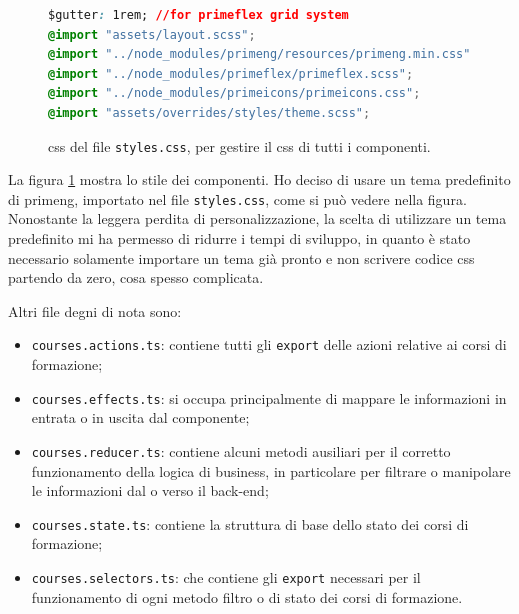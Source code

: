 \begin{figure}[H]
\centering
\begin{lstlisting}[language=CSS]
$gutter: 1rem; //for primeflex grid system
@import "assets/layout.scss";
@import "../node_modules/primeng/resources/primeng.min.css";
@import "../node_modules/primeflex/primeflex.scss";
@import "../node_modules/primeicons/primeicons.css";
@import "assets/overrides/styles/theme.scss";  
\end{lstlisting}
\caption{\label{fig:styles}\acrshort{css} del file \texttt{styles.css}, per gestire il \acrshort{css} di tutti i componenti.}
\end{figure}

La figura \ref{fig:styles} mostra lo stile dei componenti. Ho deciso di usare un tema predefinito di \acrshort{primeng}, importato nel file \texttt{styles.css}, come si può vedere nella figura. Nonostante la leggera perdita di personalizzazione, la scelta di utilizzare un tema predefinito mi ha permesso di ridurre i tempi di sviluppo, in quanto è stato necessario solamente importare un tema già pronto e non scrivere codice \acrshort{css} partendo da zero, cosa spesso complicata.

Altri file degni di nota sono:
\begin{itemize}
  \item \texttt{courses.actions.ts}: contiene tutti gli \texttt{export} delle azioni relative ai corsi di formazione;
  \item \texttt{courses.effects.ts}: si occupa principalmente di mappare le informazioni in entrata o in uscita dal componente;
  \item \texttt{courses.reducer.ts}: contiene alcuni metodi ausiliari per il corretto funzionamento della logica di business, in particolare per filtrare o manipolare le informazioni dal o verso il back-end;
  \item \texttt{courses.state.ts}: contiene la struttura di base dello stato dei corsi di formazione;
  \item \texttt{courses.selectors.ts}: che contiene gli \texttt{export} necessari per il funzionamento di ogni metodo filtro o di stato dei corsi di formazione.
\end{itemize}

